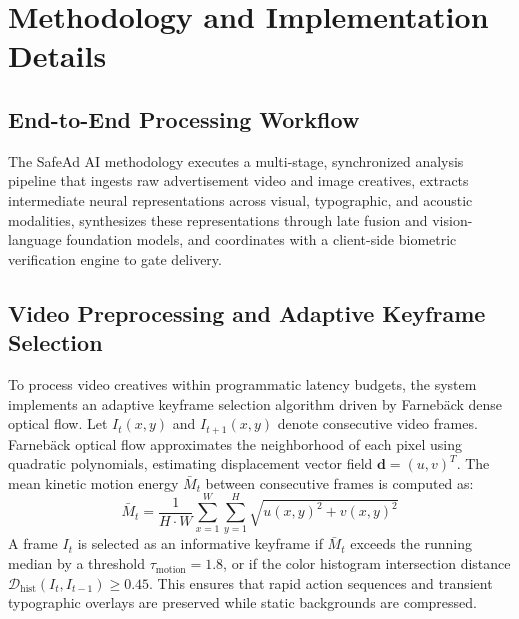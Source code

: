 \documentclass[12pt,a4paper]{report}
\begin{document}
\chapter{Methodology and Implementation Details}
\label{ch:methodology}

\section{End-to-End Processing Workflow}
The SafeAd AI methodology executes a multi-stage, synchronized analysis pipeline that ingests raw advertisement video and image creatives, extracts intermediate neural representations across visual, typographic, and acoustic modalities, synthesizes these representations through late fusion and vision-language foundation models, and coordinates with a client-side biometric verification engine to gate delivery.

\section{Video Preprocessing and Adaptive Keyframe Selection}
To process video creatives within programmatic latency budgets, the system implements an adaptive keyframe selection algorithm driven by Farneb\"{a}ck dense optical flow. Let $I_t(x, y)$ and $I_{t+1}(x, y)$ denote consecutive video frames. Farneb\"{a}ck optical flow approximates the neighborhood of each pixel using quadratic polynomials, estimating displacement vector field $\mathbf{d} = (u, v)^T$. The mean kinetic motion energy $\bar{M}_t$ between consecutive frames is computed as:
\begin{equation}
\bar{M}_t = \frac{1}{H \cdot W} \sum_{x=1}^{W} \sum_{y=1}^{H} \sqrt{u(x, y)^2 + v(x, y)^2}
\end{equation}
A frame $I_t$ is selected as an informative keyframe if $\bar{M}_t$ exceeds the running median by a threshold $\tau_{\text{motion}} = 1.8$, or if the color histogram intersection distance $\mathcal{D}_{\text{hist}}(I_t, I_{t-1}) \ge 0.45$. This ensures that rapid action sequences and transient typographic overlays are preserved while static backgrounds are compressed.
\end{document}

